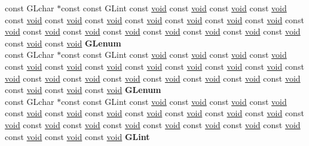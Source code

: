 \begin{DoxyCompactItemize}
\begin{tabbing}
\>const GLchar $\ast$const const GLint const \hyperlink{interfacevoid}{void} const \hyperlink{interfacevoid}{void} const \hyperlink{interfacevoid}{void} const \hyperlink{interfacevoid}{void} const \hyperlink{interfacevoid}{void} const \hyperlink{interfacevoid}{void} const \hyperlink{interfacevoid}{void} const \hyperlink{interfacevoid}{void} const \hyperlink{interfacevoid}{void} const \hyperlink{interfacevoid}{void} const \hyperlink{interfacevoid}{void} const \hyperlink{interfacevoid}{void} const \hyperlink{interfacevoid}{void} const \hyperlink{interfacevoid}{void} const \hyperlink{interfacevoid}{void} const \hyperlink{interfacevoid}{void} const \hyperlink{interfacevoid}{void} const \hyperlink{interfacevoid}{void} const \hyperlink{interfacevoid}{void} const \hyperlink{interfacevoid}{void} const \hyperlink{interfacevoid}{void} {\bfseries GLenum}\\
\>const GLchar $\ast$const const GLint const \hyperlink{interfacevoid}{void} const \hyperlink{interfacevoid}{void} const \hyperlink{interfacevoid}{void} const \hyperlink{interfacevoid}{void} const \hyperlink{interfacevoid}{void} const \hyperlink{interfacevoid}{void} const \hyperlink{interfacevoid}{void} const \hyperlink{interfacevoid}{void} const \hyperlink{interfacevoid}{void} const \hyperlink{interfacevoid}{void} const \hyperlink{interfacevoid}{void} const \hyperlink{interfacevoid}{void} const \hyperlink{interfacevoid}{void} const \hyperlink{interfacevoid}{void} const \hyperlink{interfacevoid}{void} const \hyperlink{interfacevoid}{void} const \hyperlink{interfacevoid}{void} const \hyperlink{interfacevoid}{void} const \hyperlink{interfacevoid}{void} const \hyperlink{interfacevoid}{void} const \hyperlink{interfacevoid}{void} const \hyperlink{interfacevoid}{void} {\bfseries GLenum}\\
\>const GLchar $\ast$const const GLint const \hyperlink{interfacevoid}{void} const \hyperlink{interfacevoid}{void} const \hyperlink{interfacevoid}{void} const \hyperlink{interfacevoid}{void} const \hyperlink{interfacevoid}{void} const \hyperlink{interfacevoid}{void} const \hyperlink{interfacevoid}{void} const \hyperlink{interfacevoid}{void} const \hyperlink{interfacevoid}{void} const \hyperlink{interfacevoid}{void} const \hyperlink{interfacevoid}{void} const \hyperlink{interfacevoid}{void} const \hyperlink{interfacevoid}{void} const \hyperlink{interfacevoid}{void} const \hyperlink{interfacevoid}{void} const \hyperlink{interfacevoid}{void} const \hyperlink{interfacevoid}{void} const \hyperlink{interfacevoid}{void} const \hyperlink{interfacevoid}{void} const \hyperlink{interfacevoid}{void} const \hyperlink{interfacevoid}{void} const \hyperlink{interfacevoid}{void} {\bfseries GLint}\\

\end{tabbing}
\end{DoxyCompactItemize}
